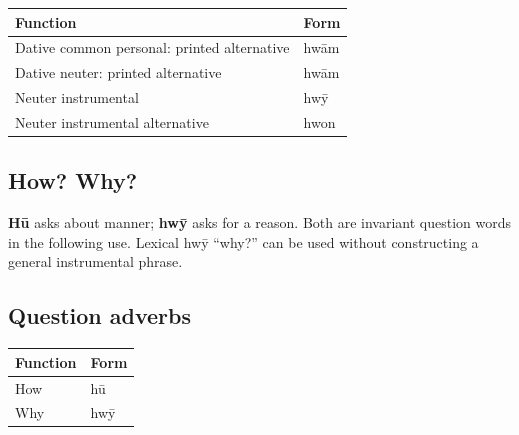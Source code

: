 \par\begingroup
\fontsize{10.5}{13.2}\selectfont
\setlength{\LTleft}{0pt}\setlength{\LTright}{\fill}
\noindent
\begin{tabular}{@{}>{\raggedright\arraybackslash}p{87.48mm}>{\raggedright\arraybackslash}p{33.71mm}@{}}
\toprule
\textbf{Function} & \textbf{Form} \\
\midrule
Dative common personal: printed alternative & hwām \\
Dative neuter: printed alternative & hwām \\
Neuter instrumental & hwȳ \\
Neuter instrumental alternative & hwon \\
\bottomrule
\end{tabular}
\par\endgroup

\subsection*{How? Why?}

\textbf{Hū} asks about manner; \textbf{hwȳ} asks for a reason. Both are invariant question words in the following use. Lexical hwȳ “why?” can be used without constructing a general instrumental phrase.

\subsection*{Question adverbs}

\par\begingroup
\fontsize{10.5}{13.2}\selectfont
\setlength{\LTleft}{0pt}\setlength{\LTright}{\fill}
\noindent
\begin{tabular}{@{}>{\raggedright\arraybackslash}p{60.59mm}>{\raggedright\arraybackslash}p{60.59mm}@{}}
\toprule
\textbf{Function} & \textbf{Form} \\
\midrule
How & hū \\
Why & hwȳ \\
\bottomrule
\end{tabular}
\par\endgroup


